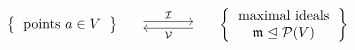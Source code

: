 \begin{theorem}
\[\begin{matrix}
        \left\{
          \begin{tabular}{c}
            points $a \in V$
          \end{tabular}
        \right\}
      & \begin{tikzcd}[column sep = large]
            {}
            \arrow[shift left]{r}{\mc{I}}
          & {}
            \arrow[shift left]{l}{\mc{V}}
        \end{tikzcd}
      & \left\{
          \begin{tabular}{c}
            maximal ideals \\
            $\mf{m} \idealeq \mc{P}(V)$
          \end{tabular}
        \right\}
    \end{matrix}
\]
\end{theorem}
